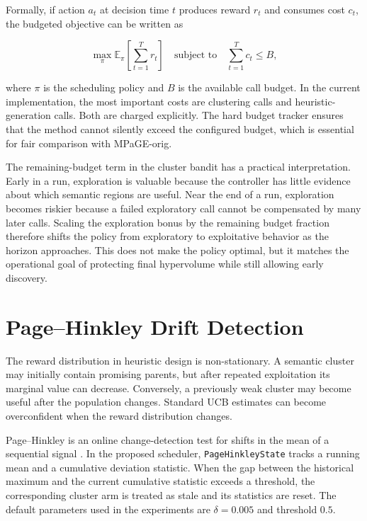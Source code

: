 Formally, if action $a_t$ at decision time $t$ produces reward $r_t$ and consumes cost $c_t$, the budgeted objective can be written as

\begin{equation}
  \max_{\pi}
  \mathbb{E}_{\pi}
  \left[
    \sum_{t=1}^{T} r_t
  \right]
  \quad
  \text{subject to}
  \quad
  \sum_{t=1}^{T} c_t \le B,
\end{equation}

where $\pi$ is the scheduling policy and $B$ is the available call budget. In the current implementation, the most important costs are clustering calls and heuristic-generation calls. Both are charged explicitly. The hard budget tracker ensures that the method cannot silently exceed the configured budget, which is essential for fair comparison with MPaGE-orig.

The remaining-budget term in the cluster bandit has a practical interpretation. Early in a run, exploration is valuable because the controller has little evidence about which semantic regions are useful. Near the end of a run, exploration becomes riskier because a failed exploratory call cannot be compensated by many later calls. Scaling the exploration bonus by the remaining budget fraction therefore shifts the policy from exploratory to exploitative behavior as the horizon approaches. This does not make the policy optimal, but it matches the operational goal of protecting final hypervolume while still allowing early discovery.

\section{Page--Hinkley Drift Detection}

The reward distribution in heuristic design is non-stationary. A semantic cluster may initially contain promising parents, but after repeated exploitation its marginal value can decrease. Conversely, a previously weak cluster may become useful after the population changes. Standard UCB estimates can become overconfident when the reward distribution changes.

Page--Hinkley is an online change-detection test for shifts in the mean of a sequential signal \cite{page1954continuous}. In the proposed scheduler, \texttt{PageHinkleyState} tracks a running mean and a cumulative deviation statistic. When the gap between the historical maximum and the current cumulative statistic exceeds a threshold, the corresponding cluster arm is treated as stale and its statistics are reset. The default parameters used in the experiments are $\delta=0.005$ and threshold $0.5$.


